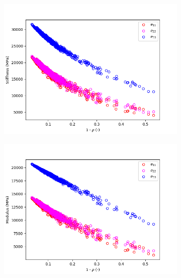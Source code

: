 \documentclass[a4paper,fleqn]{DC_ArtStyle}
\begin{document}
	\begin{figure}
		\begin{subfigure}[b]{0.45\linewidth}
			\includegraphics[width=\linewidth]{LambdaiiStiffness_Transverse}
		\end{subfigure}
		\begin{subfigure}[b]{0.45\linewidth}
			\includegraphics[width=\linewidth]{LambdaiiModulus_Transverse}
		\end{subfigure}
		\begin{subfigure}[b]{0.45\linewidth}

\end{subfigure}
\end{figure}
\end{document}

